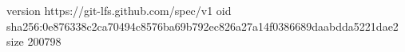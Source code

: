 version https://git-lfs.github.com/spec/v1
oid sha256:0e876338c2ca70494c8576ba69b792ec826a27a14f0386689daabdda5221dae2
size 200798
